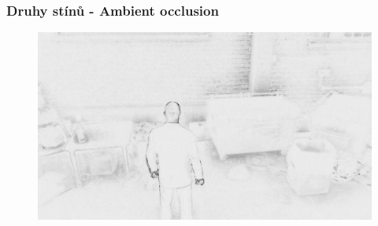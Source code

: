 \begin{frame}
  \frametitle{Druhy stínů - Ambient occlusion}
  \begin{figure}[h]
    \includegraphics[width=11.5cm,keepaspectratio]{pics/shadows/ambientOcclusion/hitmanDifference}
  \end{figure}
\end{frame}
